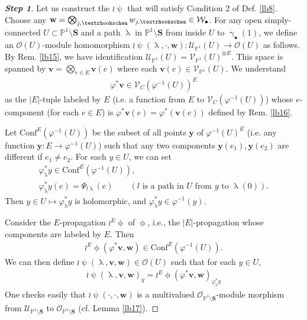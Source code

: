 \documentclass[11pt,b5paper,notitlepage]{article}
\theoremstyle{definition}
\theoremstyle{plain}
\newcommand{\mc}{\mathcal}
\newcommand{\Conf}{\mathrm{Conf}}
\newcommand{\scr}{\mathscr}
\newcommand{\mbf}{\mathbf}
\newcommand{\blt}{\bullet}
\newcommand{\Pbb}{\mathbb P}
\newcommand{\Sbf}{\mathbf{S}}
\newcommand{\vbf}{\mathbf v}
\newcommand{\wbf}{\mathbf w}
\newcommand{\tipae}{\text{\textrhookschwa}}
\numberwithin{equation}{subsection}
\begin{document}
\begin{proof}[\textbf{Step 1}] Let us construct the $\wr\uppsi$ that will satisfy Condition 2 of Def. \ref{lb8}. Choose any $\wbf=\bigotimes_{j,\tipae}w_{j,\tipae}\in \mc W_\blt$. For any open simply-connected $U\subset\Pbb^1\setminus\Sbf$ and a path $\uplambda$ in $\Pbb^1\setminus\Sbf$ from inside $U$ to $\upgamma_\blt(1)$, we define an $\scr O(U)$-module homomorphism $\wr\uppsi(\uplambda,\cdot,\wbf):\scr U_{\Pbb^1}(U)\rightarrow\scr O(U)$ as follows. By Rem. \ref{lb15}, we have identification $\scr U_{\Pbb^1}(U)=\scr V_{\Pbb^1}(U)^{\otimes E}$. This space is spanned by $\vbf=\bigotimes_{e\in E}\vbf(e)$ where each $\vbf(e)\in\scr V_{\Pbb^1}(U)$. We understand
\begin{align*}
	\varphi^*\vbf\in \scr V_C(\varphi^{-1}(U))^E	
\end{align*}
as the $|E|$-tuple labeled by $E$ (i.e. a function from $E$ to $\scr V_C(\varphi^{-1}(U))$) whose $e$-component (for each $e\in E$) is $\varphi^*\vbf(e)=\varphi^*(\vbf(e))$ defined by Rem. \ref{lb16}. 


Let $\Conf^E(\varphi^{-1}(U))$ be the subset of all points $\mbf y$ of $\varphi^{-1}(U)^E$ (i.e. any function $\mbf y:E\rightarrow \varphi^{-1}(U)$) such that any two components $\mbf y(e_1),\mbf y(e_2)$ are different if $e_1\neq e_2$. For each $y\in U$, we can set 
\begin{gather}
\varphi_\uplambda^*y\in\Conf^E(\varphi^{-1}(U)),\nonumber\\
\varphi_\uplambda^*y(e)=\Psi_{l\uplambda}(e)\qquad (\text{$l$ is a path in $U$ from $y$ to $\uplambda(0)$}).	\label{eq27}
\end{gather}
Then  $y\in U\mapsto\varphi_{\uplambda}^*y$ is holomorphic, and $\varphi_\uplambda^*y\in\varphi^{-1}(y)$.


Consider the $E$-propagation $\wr^E\upphi$ of $\upphi$, i.e., the $|E|$-propagation whose components are labeled by $E$. Then
\begin{align*}
\wr^E\upphi(\varphi^*\vbf,\wbf)\in\Conf^E(\varphi^{-1}(U)).	
\end{align*}
We can then define $\wr\uppsi(\uplambda,\vbf,\wbf)\in\scr O(U)$ such that for each $y\in U$,
\begin{gather}
\boxed{~\wr\uppsi(\uplambda,\vbf,\wbf)_y=\wr^E\upphi(\varphi^*\vbf,\wbf)_{\varphi_\uplambda^*y}~}\label{eq3}
\end{gather}
One checks easily that $\wr\uppsi(\cdot,\cdot,\wbf)$ is a multivalued $\scr O_{\Pbb^1\setminus\Sbf}$-module morphism from $\scr U_{\Pbb^1\setminus\Sbf}$ to $\scr O_{\Pbb^1\setminus\Sbf}$ (cf. Lemma \ref{lb17}).


\end{proof}
\end{document}

